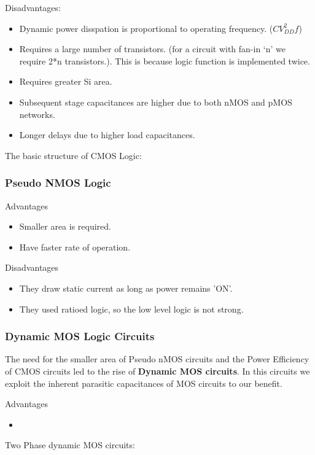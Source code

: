 \documentclass[12pt, letterpaper]{article}
\begin{document}
Disadvantages:
\begin{itemize}
    \item Dynamic power disspation is proportional to operating frequency. ($CV_{DD}^2 f$)
    \item Requires a large number of transistors. (for a circuit with fan-in ‘n’ we require 2*n transistors.). This is because logic function is implemented twice.
    \item Requires greater Si area.
    \item Subsequent stage capacitances are higher due to both nMOS and pMOS networks.
    \item Longer delays due to higher load capacitances.
\end{itemize}

The basic structure of CMOS Logic:

\subsubsection{Pseudo NMOS Logic}

Advantages
\begin{itemize}
    \item Smaller area is required.
    \item Have faster rate of operation.
\end{itemize}

Disadvantages
\begin{itemize}
    \item They draw static current as long as power remains 'ON'.
    \item They used ratioed logic, so the low level logic is not strong.
\end{itemize}

\subsubsection{Dynamic MOS Logic Circuits}
The need for the smaller area of Pseudo nMOS circuits and the Power Efficiency of CMOS circuits led to the rise of \textbf{Dynamic MOS circuits}. In this circuits we exploit the inherent parasitic capacitances of MOS circuits to our benefit.

Advantages
\begin{itemize}
    \item 
\end{itemize}

Two Phase dynamic MOS circuits:
\end{document}
